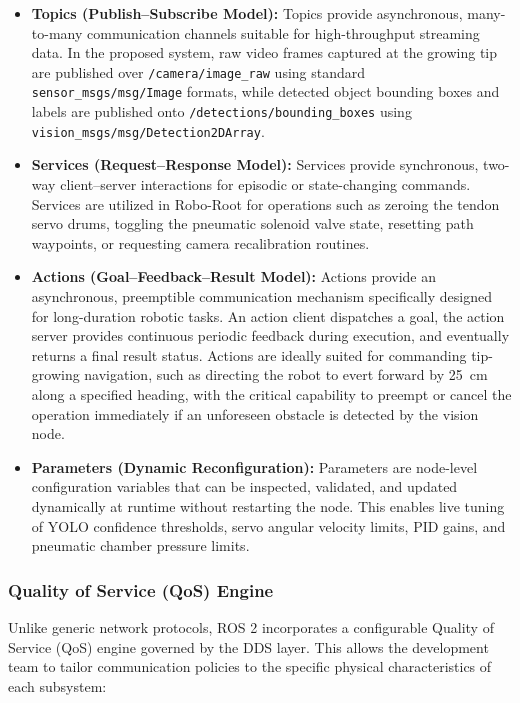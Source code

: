 \begin{itemize}
    \item \textbf{Topics (Publish--Subscribe Model):} Topics provide asynchronous, many-to-many communication channels suitable for high-throughput streaming data. In the proposed system, raw video frames captured at the growing tip are published over \texttt{/camera/image\_raw} using standard \texttt{sensor\_msgs/msg/Image} formats, while detected object bounding boxes and labels are published onto \texttt{/detections/bounding\_boxes} using \texttt{vision\_msgs/msg/Detection2DArray}.
    
    \item \textbf{Services (Request--Response Model):} Services provide synchronous, two-way client--server interactions for episodic or state-changing commands. Services are utilized in Robo-Root for operations such as zeroing the tendon servo drums, toggling the pneumatic solenoid valve state, resetting path waypoints, or requesting camera recalibration routines.
    
    \item \textbf{Actions (Goal--Feedback--Result Model):} Actions provide an asynchronous, preemptible communication mechanism specifically designed for long-duration robotic tasks. An action client dispatches a goal, the action server provides continuous periodic feedback during execution, and eventually returns a final result status. Actions are ideally suited for commanding tip-growing navigation, such as directing the robot to evert forward by 25~cm along a specified heading, with the critical capability to preempt or cancel the operation immediately if an unforeseen obstacle is detected by the vision node.
    
    \item \textbf{Parameters (Dynamic Reconfiguration):} Parameters are node-level configuration variables that can be inspected, validated, and updated dynamically at runtime without restarting the node. This enables live tuning of YOLO confidence thresholds, servo angular velocity limits, PID gains, and pneumatic chamber pressure limits.
\end{itemize}

\subsubsection{Quality of Service (QoS) Engine}
Unlike generic network protocols, ROS 2 incorporates a configurable Quality of Service (QoS) engine governed by the DDS layer. This allows the development team to tailor communication policies to the specific physical characteristics of each subsystem:


